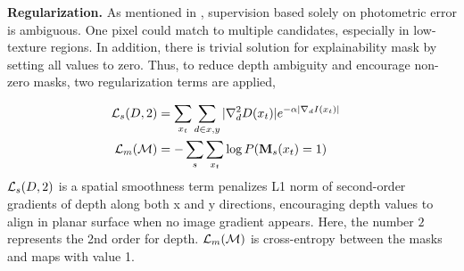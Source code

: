 

\textbf{Regularization.} 
As mentioned in , supervision based solely on photometric error is ambiguous. One pixel could match to multiple candidates, especially in low-texture regions. In addition, there is trivial solution for explainability mask by setting all values to zero. Thus, to reduce depth ambiguity and encourage non-zero masks, two regularization terms are applied, 


\begin{align}
\label{eqn:regular}
{\mathcal L}_{s}(D, 2) &= \sum_{x_t}\sum_{d \in {x, y}}|\nabla^{2}_dD(x_t)|e^{-\alpha|\nabla_dI(x_t)|} & \nonumber \\
{\mathcal L}_{m}({\mathcal M}) &= -\sum_s\sum_{x_t}\log P({\mathbf M_s}(x_t) = 1) &
\end{align}
${\mathcal L}_{s}(D, 2)$ is a spatial smoothness term penalizes L1 norm of second-order gradients of depth along both x and y directions, encouraging depth values to align in planar surface when no image gradient appears. Here, the number $2$ represents the 2nd order for depth. ${\mathcal L}_{m}({\mathcal M})$ is cross-entropy between the masks and maps with value 1.

